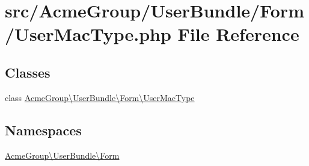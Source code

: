 \hypertarget{_user_mac_type_8php}{\section{src/\+Acme\+Group/\+User\+Bundle/\+Form/\+User\+Mac\+Type.php File Reference}
\label{_user_mac_type_8php}
}
\subsection*{Classes}
\begin{DoxyCompactItemize}
\item 
class \hyperlink{class_acme_group_1_1_user_bundle_1_1_form_1_1_user_mac_type}{Acme\+Group\textbackslash{}\+User\+Bundle\textbackslash{}\+Form\textbackslash{}\+User\+Mac\+Type}
\end{DoxyCompactItemize}
\subsection*{Namespaces}
\begin{DoxyCompactItemize}
\item 
 \hyperlink{namespace_acme_group_1_1_user_bundle_1_1_form}{Acme\+Group\textbackslash{}\+User\+Bundle\textbackslash{}\+Form}
\end{DoxyCompactItemize}
